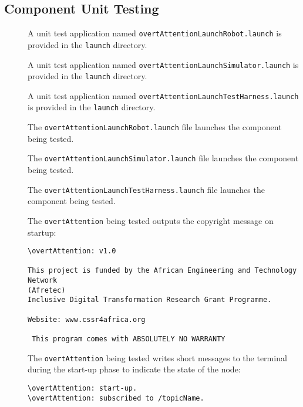 \documentclass{CSSRforAfrica}
\newcommand{\checkboxChecked}{\fbox{\ding{51}}} %
\newcommand{\checkboxDashed}{\fbox{--}}         %
\begin{document}
\subsection{Component Unit Testing}
\label{subsection:overt_attention_test_unit_testing}


\begin{description}
\item[\checkboxChecked] A unit test application named {\small \verb+overtAttentionLaunchRobot.launch+} is provided in the {\small \verb+launch+} directory. 

\item[\checkboxChecked] A unit test application named {\small \verb+overtAttentionLaunchSimulator.launch+} is provided in the {\small \verb+launch+} directory. 

\item[\checkboxChecked] A unit test application named {\small \verb+overtAttentionLaunchTestHarness.launch+} is provided in the {\small \verb+launch+} directory. 

\item[\checkboxChecked] The {\small \verb+overtAttentionLaunchRobot.launch+} file  launches the component being tested.

\item[\checkboxDashed] The {\small \verb+overtAttentionLaunchSimulator.launch+} file  launches the component being tested.

\item[\checkboxChecked] The {\small \verb+overtAttentionLaunchTestHarness.launch+} file  launches the component being tested.

\item[\checkboxChecked]  The {\small \verb+overtAttention+} being tested outputs the copyright message on startup:
\begin{verbatim}
\overtAttention: v1.0
 
This project is funded by the African Engineering and Technology Network 
(Afretec) 
Inclusive Digital Transformation Research Grant Programme.
 
Website: www.cssr4africa.org
 
 This program comes with ABSOLUTELY NO WARRANTY
\end{verbatim}

\item[\checkboxChecked]  The {\small \verb+overtAttention+} being tested writes short messages to the terminal during the start-up phase to
 indicate the state of the node:
\begin{verbatim}
\overtAttention: start-up.
\overtAttention: subscribed to /topicName.
\end{verbatim}


\end{description}
\end{document}
